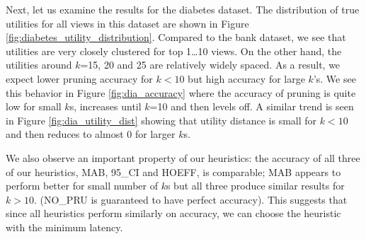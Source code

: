 
 
Next, let us examine the results for the diabetes dataset.
The distribution of true utilities for all views in this dataset are shown in
Figure \ref{fig:diabetes_utility_distribution}.
Compared to the bank dataset, we see that utilities are very closely
clustered for top 1\ldots10 views.
On the other hand, the utilities around $k$=15, 20 and 25 are relatively widely
spaced.
As a result, we expect lower pruning accuracy for $k<10$ but high accuracy for
large $k$'s.
We see this behavior in Figure \ref{fig:dia_accuracy} where the accuracy of
pruning is quite low for small $k$s, increases until $k$=10 and then levels off.
A similar trend is seen in Figure \ref{fig:dia_utility_dist} showing that
utility distance is small for $k<10$ and then reduces to almost 0 for larger
$k$s.

We also observe an important property of our heuristics: the accuracy of all
three of our heuristics, MAB, 95\_CI and HOEFF, is comparable; MAB appears to
perform better for small number of $k$s but all three produce similar results
for $k>10$. (NO\_PRU is guaranteed to have perfect accuracy).
This suggests that since all heuristics perform similarly on accuracy, we can
choose the heuristic with the minimum latency.\\

